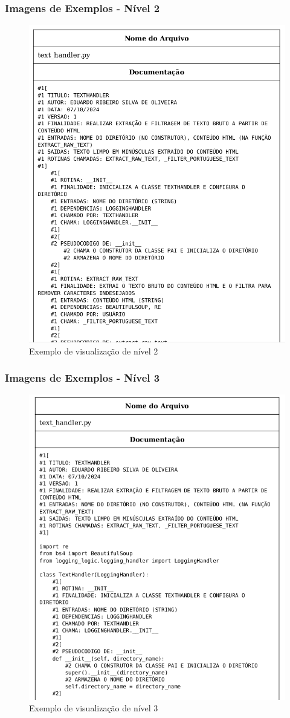 \documentclass{beamer}
\begin{document}
\begin{frame}
  \frametitle{Imagens de Exemplos - Nível 2}
  \begin{figure}
    \centering
    \includegraphics[width=0.7\linewidth]{nivel2.png}
    \caption{Exemplo de visualização de nível 2}
  \end{figure}
\end{frame}

\begin{frame}
  \frametitle{Imagens de Exemplos - Nível 3}
  \begin{figure}
    \centering
    \includegraphics[width=0.7\linewidth]{nivel3.png}
    \caption{Exemplo de visualização de nível 3}
  \end{figure}
\end{frame}
\end{document}
